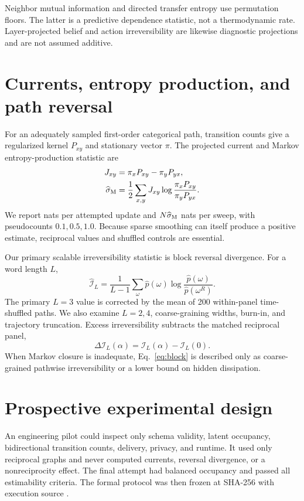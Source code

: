 \documentclass[12pt]{article}
\begin{document}
Neighbor mutual information and directed transfer entropy use permutation
floors. The latter is a predictive dependence statistic, not a thermodynamic
rate. Layer-projected belief and action irreversibility are likewise diagnostic
projections and are not assumed additive.

\section{Currents, entropy production, and path reversal}

For an adequately sampled first-order categorical path, transition counts give
a regularized kernel $P_{xy}$ and stationary vector $\pi$. The projected current
and Markov entropy-production statistic are
\begin{align}
 J_{xy}&=\pi_xP_{xy}-\pi_yP_{yx},\\
 \widehat\sigma_{\rm M}
 &=\frac12\sum_{x,y}J_{xy}
 \log\frac{\pi_xP_{xy}}{\pi_yP_{yx}}.
 \label{eq:epr}
\end{align}
We report nats per attempted update and $N\widehat\sigma_{\rm M}$ nats per
sweep, with pseudocounts $0.1,0.5,1.0$. Because sparse smoothing can itself
produce a positive estimate, reciprocal values and shuffled controls are
essential.

Our primary scalable irreversibility statistic is block reversal divergence.
For a word length $L$,
\begin{equation}
 \widehat{\mathcal I}_L=\frac{1}{L-1}
 \sum_{\omega}\widehat p(\omega)
 \log\frac{\widehat p(\omega)}{\widehat p(\omega^R)}.
 \label{eq:block}
\end{equation}
The primary $L=3$ value is corrected by the mean of 200 within-panel
time-shuffled paths. We also examine $L=2,4$, coarse-graining widths, burn-in,
and trajectory truncation. Excess irreversibility subtracts the matched
reciprocal panel,
\begin{equation}
 \Delta\mathcal I_L(\alpha)=\mathcal I_L(\alpha)-\mathcal I_L(0).
\end{equation}
When Markov closure is inadequate, Eq.~\eqref{eq:block} is described only as
coarse-grained pathwise irreversibility or a lower bound on hidden dissipation.

\section{Prospective experimental design}

An engineering pilot could inspect only schema validity, latent occupancy,
bidirectional transition counts, delivery, privacy, and runtime. It used only
reciprocal graphs and never computed currents, reversal divergence, or a
nonreciprocity effect. The final attempt had balanced occupancy and passed all
estimability criteria. The formal protocol was then frozen at SHA-256
\texttt{}
with execution source
\texttt{}.
\end{document}
